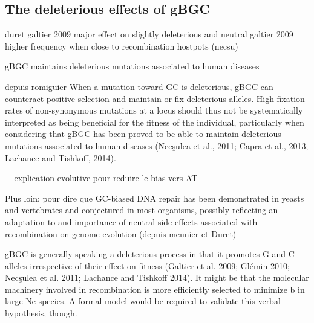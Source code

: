 \subsection{The deleterious effects of gBGC}


duret galtier 2009 major effect on slightly deleterious	and neutral
galtier 2009
higher frequency when close to recombination hostpots (necsu)

gBGC maintains deleterious mutations associated to human diseases \citep{necsulea2011meiotic,capra2013modelbased,lachance2014biased,xue2016basebiased}



depuis romiguier
When a mutation toward GC is deleterious, gBGC can counteract positive selection and maintain or fix deleterious alleles. High fixation rates of non-synonymous mutations at a locus should thus not be systematically interpreted as being beneficial for the fitness of the individual, particularly when considering that gBGC has been proved to be able to maintain deleterious mutations associated to human diseases (Necşulea et al., 2011; Capra et al., 2013; Lachance and Tishkoff, 2014).




+ explication evolutive pour reduire le bias vers AT



Plus loin: \citep{marais2003biased} pour dire que  GC-biased DNA repair has been
demonstrated in yeasts and vertebrates and conjectured
in most organisms, possibly reflecting an adaptation to
and importance of neutral side-effects
associated with recombination on genome evolution
(depuis meunier et Duret)




gBGC is generally speaking a deleterious process in that it promotes G and C alleles irrespective of their effect on fitness (Galtier et al. 2009; Glémin 2010; Necşulea et al. 2011; Lachance and Tishkoff 2014). It might be that the molecular machinery involved in recombination is more efficiently selected to minimize b in large Ne species. A formal model would be required to validate this verbal hypothesis, though. 



